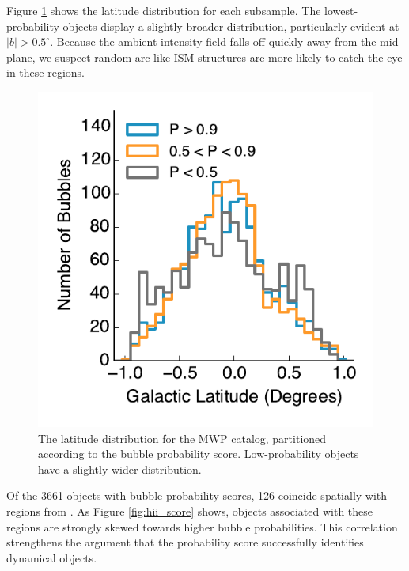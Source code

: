 Figure \ref{fig:dist_lat} shows the latitude distribution for each subsample. The lowest-probability objects display a slightly broader distribution, particularly evident at $|b| > 0.5^\circ$. Because the ambient intensity field falls off quickly away from the mid-plane, we suspect random arc-like ISM structures are more likely to catch the eye in these regions.

\begin{figure}[h!]
\includegraphics{dist_lat}
\caption{The latitude distribution for the MWP catalog, partitioned according to the bubble probability score.
Low-probability objects have a slightly wider distribution.}
\label{fig:dist_lat}
\end{figure}

Of the 3661 objects with bubble probability scores, 126 coincide spatially with \hii\, regions from \cite{Anderson11}. As Figure \ref{fig:hii_score} shows, objects associated with these \hii\, regions are strongly skewed towards higher bubble probabilities. This correlation strengthens the argument that the probability score successfully identifies dynamical objects.

